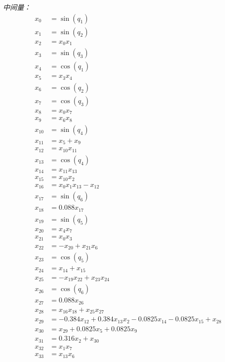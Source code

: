 \documentclass[11pt]{article}
\begin{document}
\textit{中间量：}
\begin{align*}
x_{0} &= \sin{\left(q_{1} \right)} \\
x_{1} &= \sin{\left(q_{2} \right)} \\
x_{2} &= x_{0} x_{1} \\
x_{3} &= \sin{\left(q_{3} \right)} \\
x_{4} &= \cos{\left(q_{1} \right)} \\
x_{5} &= x_{3} x_{4} \\
x_{6} &= \cos{\left(q_{2} \right)} \\
x_{7} &= \cos{\left(q_{3} \right)} \\
x_{8} &= x_{0} x_{7} \\
x_{9} &= x_{6} x_{8} \\
x_{10} &= \sin{\left(q_{4} \right)} \\
x_{11} &= x_{5} + x_{9} \\
x_{12} &= x_{10} x_{11} \\
x_{13} &= \cos{\left(q_{4} \right)} \\
x_{14} &= x_{11} x_{13} \\
x_{15} &= x_{10} x_{2} \\
x_{16} &= x_{0} x_{1} x_{13} - x_{12} \\
x_{17} &= \sin{\left(q_{6} \right)} \\
x_{18} &= 0.088 x_{17} \\
x_{19} &= \sin{\left(q_{5} \right)} \\
x_{20} &= x_{4} x_{7} \\
x_{21} &= x_{0} x_{3} \\
x_{22} &= - x_{20} + x_{21} x_{6} \\
x_{23} &= \cos{\left(q_{5} \right)} \\
x_{24} &= x_{14} + x_{15} \\
x_{25} &= - x_{19} x_{22} + x_{23} x_{24} \\
x_{26} &= \cos{\left(q_{6} \right)} \\
x_{27} &= 0.088 x_{26} \\
x_{28} &= x_{16} x_{18} + x_{25} x_{27} \\
x_{29} &= - 0.384 x_{12} + 0.384 x_{13} x_{2} - 0.0825 x_{14} - 0.0825 x_{15} + x_{28} \\
x_{30} &= x_{29} + 0.0825 x_{5} + 0.0825 x_{9} \\
x_{31} &= 0.316 x_{2} + x_{30} \\
x_{32} &= x_{1} x_{7} \\
x_{33} &= x_{13} x_{6} \\

\end{align*}
\end{document}
